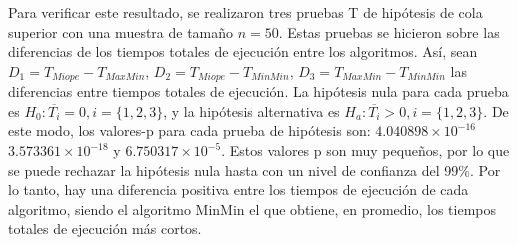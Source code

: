 Para verificar este resultado, se realizaron tres pruebas T de hipótesis de cola superior con una muestra de tamaño $n=50$. Estas pruebas se hicieron sobre las diferencias de los tiempos totales de ejecución entre los algoritmos. Así, sean $D_1 = T_{Miope} - T_{MaxMin}$, $D_2 = T_{Miope} - T_{MinMin}$, $D_3 = T_{MaxMin} - T_{MinMin}$ las diferencias entre tiempos totales de ejecución. La hipótesis nula para cada prueba es $H_0: \overline{T_i} = 0, i=\{1,2,3\}$, y la hipótesis alternativa es $H_a: \overline{T_i} > 0, i=\{1,2,3\}$. De este modo, los valores-p para cada prueba de hipótesis son: $4.040898 \times 10^{-16}$ $3.573361 \times 10^{-18}$ y $6.750317 \times 10^{-5}$. Estos valores p son muy pequeños, por lo que se puede rechazar la hipótesis nula hasta con un nivel de confianza del 99\%. Por lo tanto, hay una diferencia positiva entre los tiempos de ejecución de cada algoritmo, siendo el algoritmo MinMin el que obtiene, en promedio, los tiempos totales de ejecución más cortos.

